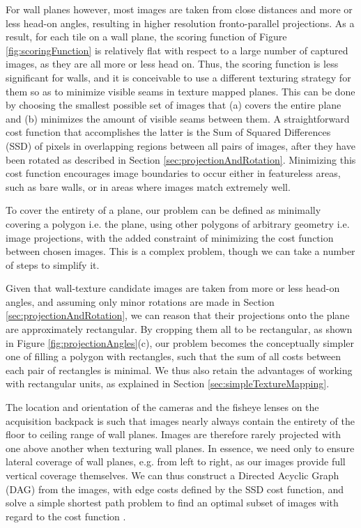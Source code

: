 \message{ !name(oldpaper.tex)}\documentclass[10pt,twocolumn,letterpaper]{article}
\begin{document}
For wall planes however, most images are taken from close distances
and more or less head-on angles, resulting in higher resolution
fronto-parallel projections. As a result, for each tile on a wall
plane, the scoring function of Figure \ref{fig:scoringFunction} is
relatively flat with respect to a large number of captured images, as
they are all more or less head on. Thus, the scoring function is less
significant for walls, and it is conceivable to use a different
texturing strategy for them so as to minimize visible seams in texture
mapped planes. This can be done by choosing the smallest possible set
of images that (a) covers the entire plane and (b) minimizes the
amount of visible seams between them. A straightforward cost function
that accomplishes the latter is the Sum of Squared Differences (SSD)
of pixels in overlapping regions between all pairs of images, after
they have been rotated as described in Section
\ref{sec:projectionAndRotation}. Minimizing this cost function
encourages image boundaries to occur either in featureless areas, such
as bare walls, or in areas where images match extremely well.

To cover the entirety of a plane, our problem can be defined as
minimally covering a polygon i.e. the plane, using other polygons of
arbitrary geometry i.e. image projections, with the added constraint
of minimizing the cost function between chosen images.  This is a
complex problem, though we can take a number of steps to simplify it.

Given that wall-texture candidate images are taken from more or less
head-on angles, and assuming only minor rotations are made in Section
\ref{sec:projectionAndRotation}, we can reason that their projections
onto the plane are approximately rectangular. By cropping them all to
be rectangular, as shown in Figure \ref{fig:projectionAngles}(c), our
problem becomes the conceptually simpler one of filling a polygon with
rectangles, such that the sum of all costs between each pair of
rectangles is minimal. We thus also retain the advantages of working
with rectangular units, as explained in Section
\ref{sec:simpleTextureMapping}.

The location and orientation of the cameras and the fisheye lenses on
the acquisition backpack is such that images nearly always contain the
entirety of the floor to ceiling range of wall planes. Images are
therefore rarely projected with one above another when texturing wall
planes. In essence, we need only to ensure lateral coverage of wall
planes, e.g. from left to right, as our images provide full vertical
coverage themselves. We can thus construct a Directed Acyclic Graph
(DAG) from the images, with edge costs defined by the SSD cost
function, and solve a simple shortest path problem to find an optimal
subset of images with regard to the cost function \cite{dijkstra}.
\end{document}
